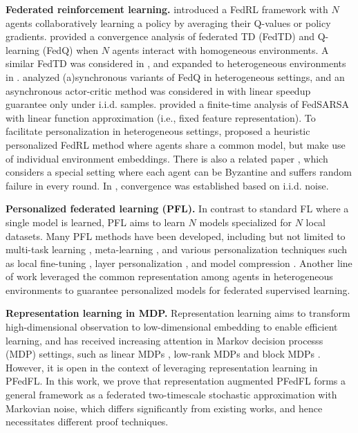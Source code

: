\documentclass{article} %
\theoremstyle{plain}
\theoremstyle{definition}
\theoremstyle{remark}
\begin{document}
{ \textbf{Federated reinforcement learning.}
\cite{jin2022federated} introduced a FedRL framework with $N$ agents collaboratively learning a policy by averaging their Q-values or policy gradients. \cite{khodadadian2022federated} provided a convergence analysis of federated TD (FedTD) and Q-learning (FedQ) when 
$N$ agents interact with homogeneous environments.  
A similar FedTD was considered in \cite{dal2023federated}, and expanded to heterogeneous environments in \cite{wang2023federated}. \cite{woo2023the} analyzed (a)synchronous variants of FedQ in heterogeneous settings, and an asynchronous actor-critic method was considered in \cite{shen2023towards} with linear speedup guarantee only under i.i.d. samples. \cite{zhang2024finite} provided a finite-time analysis of FedSARSA with linear function approximation (i.e., fixed feature representation). To facilitate personalization in heterogeneous settings, \cite{jin2022federated} proposed a heuristic personalized FedRL method where agents share a common model, but make use of individual environment embeddings.  There is also a related paper \cite{fan2021fault}, which considers a special setting where each agent can be Byzantine and suffers random failure in every round. In \cite{fan2021fault}, convergence was established based on i.i.d. noise.  


 \textbf{Personalized federated learning (PFL).} In contrast to standard FL where a single model is learned, PFL aims to learn $N$ models specialized for $N$ local datasets. Many PFL methods have been developed, including but not limited to multi-task learning \citep{smith2017federated}, meta-learning \citep{chen2018federated}, and various personalization techniques such as local fine-tuning \citep{fallah2020personalized}, layer personalization \citep{arivazhagan2019federated}, and model compression \citep{bergou2022personalized}. Another line of work \citep{collins2021exploiting,xiong2023deprl} leveraged the common representation among agents in heterogeneous environments to guarantee personalized models for federated supervised learning. 



\textbf{Representation learning in MDP.} Representation learning aims to transform high-dimensional observation to low-dimensional embedding to enable efficient learning, and has received increasing attention in Markov decision processs (MDP) settings, such as linear MDPs \citep{jin2020provably}, low-rank MDPs \citep{modi2021model,agarwal2020flambe} and block MDPs \citep{zhang2022efficient}. However, it is open in the context of leveraging representation learning in PFedFL. In this work, we prove that representation augmented PFedFL 
 forms a general framework as a federated two-timescale stochastic approximation with Markovian noise, which differs significantly from existing works, and hence necessitates different proof techniques. 





}
\end{document}
